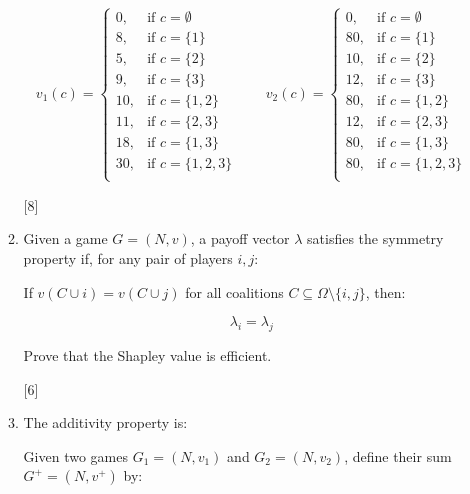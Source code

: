 \documentclass[12pt,a4paper]{article}
\begin{document}
\begin{enumerate}
\begin{enumerate}
            \[
                v_1(c) = \begin{cases}
                    0,& \text{if }c=\emptyset\\
                    8,& \text{if }c=\{1\}\\
                    5,& \text{if } c=\{2\}\\
                    9,& \text{if } c=\{3\}\\
                    10,& \text{if } c=\{1,2\}\\
                    11,& \text{if } c=\{2,3\}\\
                    18,& \text{if } c=\{1,3\}\\
                    30,& \text{if } c=\{1,2,3\}\\
                \end{cases}
                \qquad
                v_2(c) = \begin{cases}
                    0,& \text{if }c=\emptyset\\
                    80,& \text{if }c=\{1\}\\
                    10,& \text{if } c=\{2\}\\
                    12,& \text{if } c=\{3\}\\
                    80,& \text{if } c=\{1,2\}\\
                    12,& \text{if } c=\{2,3\}\\
                    80,& \text{if } c=\{1,3\}\\
                    80,& \text{if } c=\{1,2,3\}\\
                \end{cases}
            \]

        \hfill{[8]}

        \item 
Given a game $G = (N, v)$, a payoff vector $\lambda$ satisfies the symmetry property if, for any pair of players $i, j$:

If $v(C \cup i) = v(C \cup j)$ for all coalitions $C \subseteq \Omega \setminus \{i, j\}$, then:

$$
\lambda_i = \lambda_j
$$

            Prove that the Shapley value is efficient.

        \hfill{[6]}

        \item The additivity property is:

        Given two games \(G_1 = (N, v_1)\) and \(G_2 = (N, v_2)\), define their sum \(G^+ = (N, v^+)\) by:


\end{enumerate}
\end{enumerate}
\end{document}
